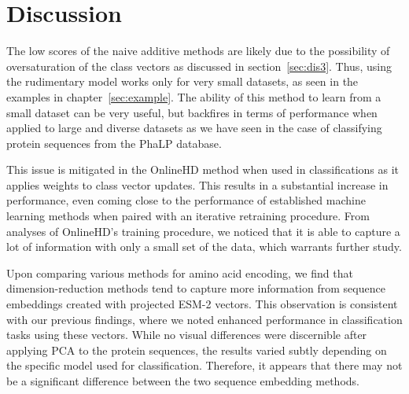 \section{Discussion}
The low scores of the naive additive methods are likely due to the possibility of oversaturation of the class vectors as discussed in section~\ref{sec:dis3}. Thus, using the rudimentary model works only for very small datasets, as seen in the examples in chapter~\ref{sec:example}. The ability of this method to learn from a small dataset can be very useful, but backfires in terms of performance when applied to large and diverse datasets as we have seen in the case of classifying protein sequences from the PhaLP database.

This issue is mitigated in the OnlineHD method when used in classifications as it applies weights to class vector updates. This results in a substantial increase in performance, even coming close to the performance of established machine learning methods when paired with an iterative retraining procedure. From analyses of OnlineHD's training procedure, we noticed that it is able to capture a lot of information with only a small set of the data, which warrants further study.

Upon comparing various methods for amino acid encoding, we find that dimension-reduction methods tend to capture more information from sequence embeddings created with projected ESM-2 vectors. This observation is consistent with our previous findings, where we noted enhanced performance in classification tasks using these vectors. While no visual differences were discernible after applying PCA to the protein sequences, the results varied subtly depending on the specific model used for classification. Therefore, it appears that there may not be a significant difference between the two sequence embedding methods.
